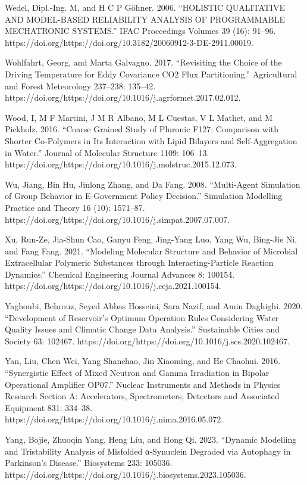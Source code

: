 \documentclass[utf8]{gradu3}
\begin{document}
Wedel, Dipl.-Ing. M, and H C P Göhner. 2006. “HOLISTIC QUALITATIVE AND MODEL-BASED RELIABILITY ANALYSIS OF PROGRAMMABLE MECHATRONIC SYSTEMS.” IFAC Proceedings Volumes 39 (16): 91–96. https://doi.org/https://doi.org/10.3182/20060912-3-DE-2911.00019.

Wohlfahrt, Georg, and Marta Galvagno. 2017. “Revisiting the Choice of the Driving Temperature for Eddy Covariance CO2 Flux Partitioning.” Agricultural and Forest Meteorology 237–238: 135–42. https://doi.org/https://doi.org/10.1016/j.agrformet.2017.02.012.

Wood, I, M F Martini, J M R Albano, M L Cuestas, V L Mathet, and M Pickholz. 2016. “Coarse Grained Study of Pluronic F127: Comparison with Shorter Co-Polymers in Its Interaction with Lipid Bilayers and Self-Aggregation in Water.” Journal of Molecular Structure 1109: 106–13. https://doi.org/https://doi.org/10.1016/j.molstruc.2015.12.073.

Wu, Jiang, Bin Hu, Jinlong Zhang, and Da Fang. 2008. “Multi-Agent Simulation of Group Behavior in E-Government Policy Decision.” Simulation Modelling Practice and Theory 16 (10): 1571–87. https://doi.org/https://doi.org/10.1016/j.simpat.2007.07.007.

Xu, Run-Ze, Jia-Shun Cao, Ganyu Feng, Jing-Yang Luo, Yang Wu, Bing-Jie Ni, and Fang Fang. 2021. “Modeling Molecular Structure and Behavior of Microbial Extracellular Polymeric Substances through Interacting-Particle Reaction Dynamics.” Chemical Engineering Journal Advances 8: 100154. https://doi.org/https://doi.org/10.1016/j.ceja.2021.100154.

Yaghoubi, Behrouz, Seyed Abbas Hosseini, Sara Nazif, and Amin Daghighi. 2020. “Development of Reservoir’s Optimum Operation Rules Considering Water Quality Issues and Climatic Change Data Analysis.” Sustainable Cities and Society 63: 102467. https://doi.org/https://doi.org/10.1016/j.scs.2020.102467.

Yan, Liu, Chen Wei, Yang Shanchao, Jin Xiaoming, and He Chaohui. 2016. “Synergistic Effect of Mixed Neutron and Gamma Irradiation in Bipolar Operational Amplifier OP07.” Nuclear Instruments and Methods in Physics Research Section A: Accelerators, Spectrometers, Detectors and Associated Equipment 831: 334–38. https://doi.org/https://doi.org/10.1016/j.nima.2016.05.072.

Yang, Bojie, Zhuoqin Yang, Heng Liu, and Hong Qi. 2023. “Dynamic Modelling and Tristability Analysis of Misfolded α-Synuclein Degraded via Autophagy in Parkinson’s Disease.” Biosystems 233: 105036. https://doi.org/https://doi.org/10.1016/j.biosystems.2023.105036.
\end{document}
